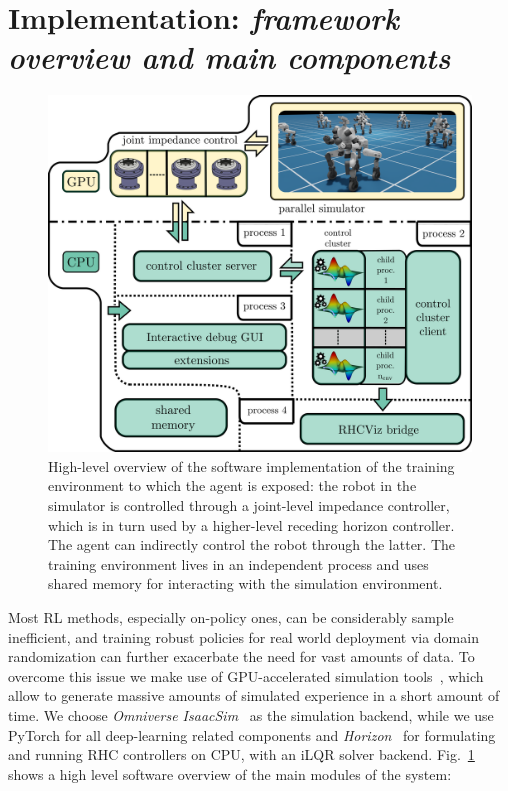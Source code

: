 \section{Implementation: \textnormal{\textit{framework overview and main components}}}
\begin{figure}[t]
	\centering
	\includegraphics[width=0.85\columnwidth]{imgs/cocluster_arch.pdf}
	\caption{High-level overview of the software implementation of the training environment to which the agent is exposed: the robot in the simulator is controlled through a joint-level impedance controller, which is in turn used by a higher-level receding horizon controller. The agent can indirectly control the robot through the latter. The training environment lives in an independent process and uses shared memory for interacting with the simulation environment.}
	\label{fig:coclbridge_arch}
\end{figure}
Most RL methods, especially on-policy ones, can be considerably sample inefficient, and training robust policies for real world deployment via domain randomization can further exacerbate the need for vast amounts of data. To overcome this issue we make use of GPU-accelerated simulation tools~\cite{web::isaacsim,rl:mujocoaccelereted2023}, which allow to generate massive amounts of simulated experience in a short amount of time. We choose \textit{Omniverse IsaacSim}~\cite{web::isaacsim} as the simulation backend, while we use PyTorch for all deep-learning related components and  \textit{Horizon}~\cite{frameworks::horizon_to} for formulating and running RHC controllers on CPU, with an iLQR solver backend.
Fig.~\ref{fig:coclbridge_arch} shows a high level software overview of the main modules of the system:

